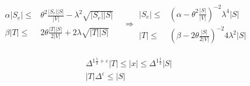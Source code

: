 \begin{equation*}
  \begin{split}
    \begin{matrix}
   \alpha  |S_{e}|  \le &\theta^{2}\frac{|S_{e}||S|}{|V|} - \lambda^{2}\sqrt{ |S_{e}||S| } \\
   \beta |T|   \le  &2\theta \frac{|T||S|}{2|V|} +2 \lambda\sqrt{ |T||S| }  
 \end{matrix}
 & \Rightarrow \begin{matrix}
 |S_{e}|  \le &\left( \alpha -   \theta^{2} \frac{|S|}{|V|} \right)^{-2} \lambda^{4} |S| \\
 |T|  \le &\left( \beta -   2 \theta \frac{|S|}{2|V|} \right)^{-2} 4\lambda^{2} |S|
 \end{matrix}
 \end{split}
\end{equation*}

\begin{equation*} 
  \begin{split}
   & \Delta^{1\frac{1}{2} + \varepsilon}|T| \le |x| \le  \Delta^{1\frac{1}{2}}|S| \\
   & |T| \Delta^{\varepsilon} \le |S|
  \end{split}
\end{equation*}




